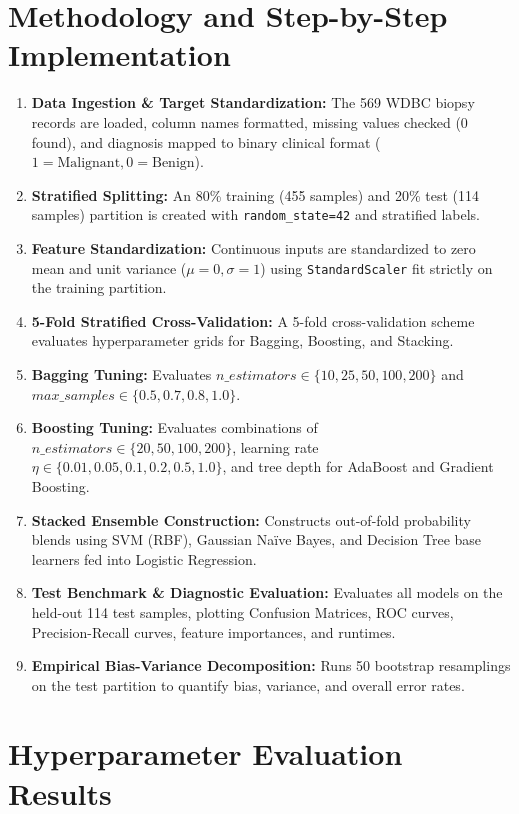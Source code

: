 \documentclass[12pt,a4paper]{article}
\begin{document}
\section{Methodology and Step-by-Step Implementation}
\begin{enumerate}
    \item \textbf{Data Ingestion \& Target Standardization:} The 569 WDBC biopsy records are loaded, column names formatted, missing values checked (0 found), and diagnosis mapped to binary clinical format ($1 = \text{Malignant}, 0 = \text{Benign}$).
    \item \textbf{Stratified Splitting:} An 80\% training (455 samples) and 20\% test (114 samples) partition is created with \texttt{random\_state=42} and stratified labels.
    \item \textbf{Feature Standardization:} Continuous inputs are standardized to zero mean and unit variance ($\mu=0, \sigma=1$) using \texttt{StandardScaler} fit strictly on the training partition.
    \item \textbf{5-Fold Stratified Cross-Validation:} A 5-fold cross-validation scheme evaluates hyperparameter grids for Bagging, Boosting, and Stacking.
    \item \textbf{Bagging Tuning:} Evaluates $n\_estimators \in \{10, 25, 50, 100, 200\}$ and $max\_samples \in \{0.5, 0.7, 0.8, 1.0\}$.
    \item \textbf{Boosting Tuning:} Evaluates combinations of $n\_estimators \in \{20, 50, 100, 200\}$, learning rate $\eta \in \{0.01, 0.05, 0.1, 0.2, 0.5, 1.0\}$, and tree depth for AdaBoost and Gradient Boosting.
    \item \textbf{Stacked Ensemble Construction:} Constructs out-of-fold probability blends using SVM (RBF), Gaussian Na\"ive Bayes, and Decision Tree base learners fed into Logistic Regression.
    \item \textbf{Test Benchmark \& Diagnostic Evaluation:} Evaluates all models on the held-out 114 test samples, plotting Confusion Matrices, ROC curves, Precision-Recall curves, feature importances, and runtimes.
    \item \textbf{Empirical Bias-Variance Decomposition:} Runs 50 bootstrap resamplings on the test partition to quantify bias, variance, and overall error rates.
\end{enumerate}

\section{Hyperparameter Evaluation Results}
\end{document}
